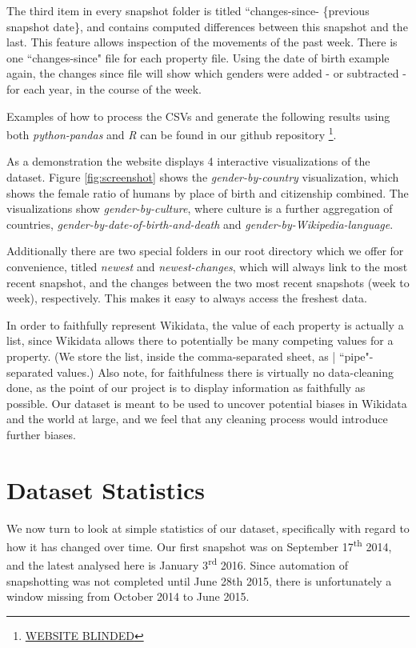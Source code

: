 \documentclass[letterpaper]{article}
\begin{document}
The third item in every snapshot folder is titled ``changes-since- \{previous snapshot date\}, and contains computed differences between this snapshot and the last. This feature allows inspection of the movements of the past week. There is one ``changes-since" file for each property file. Using the date of birth example again, the changes since file will show which genders were added - or subtracted - for each year, in the course of the week.

Examples of how to process the CSVs and generate the following results using both \textit{python-pandas} and \textit{R} can be found in our github repository \footnote{\url{WEBSITE BLINDED}}.

As a demonstration the website displays 4 interactive visualizations of the dataset. Figure \ref{fig:screenshot} shows the \textit{gender-by-country} visualization, which shows the female ratio of humans by place of birth and citizenship combined. The visualizations show \textit{gender-by-culture}, where culture is a further aggregation of countries, \textit{gender-by-date-of-birth-and-death} and \textit{gender-by-Wikipedia-language}.

Additionally there are two special folders in our root directory which we offer for convenience,  titled \textit{newest} and \textit{newest-changes}, which will always link to the most recent snapshot, and the changes between the two most recent snapshots (week to week), respectively. This makes it easy to always access the freshest data.

In order to faithfully represent Wikidata, the value of each property is actually a list, since Wikidata allows there to potentially be many competing values for a property. (We store the list, inside the comma-separated sheet, as | ``pipe"-separated values.)  Also note, for faithfulness there is virtually no data-cleaning done, as the point of our project is to display information as faithfully as possible. Our dataset is meant to be used to uncover potential biases in Wikidata and the world at large, and we feel that any cleaning process would introduce further biases.

\section{Dataset Statistics}
We now turn to look at simple statistics of our dataset, specifically with regard to how it has changed over time. Our first snapshot was on September 17\textsuperscript{th} 2014, and the latest analysed here is January 3\textsuperscript{rd} 2016. Since automation of snapshotting was not completed until June 28th 2015, there is unfortunately a window missing from October 2014 to June 2015. 
\end{document}

